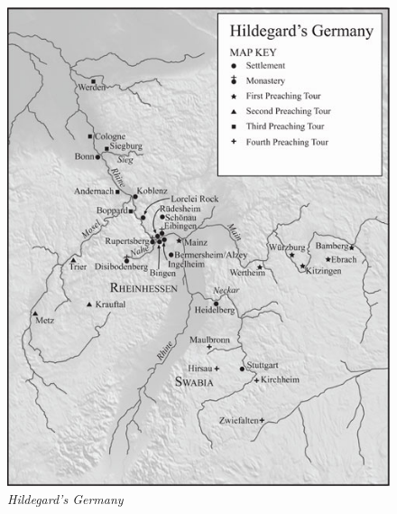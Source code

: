 \documentclass{turabian-researchpaper}
\begin{document}
\begin{figure}
    \includegraphics{Hildegard_map.jpg}
    \caption{\emph{Hildegard's Germany}\autocite{ISHVBS}}
    \label{Hildegard's Germany.}
\end{figure}

\clearpage
\printbibliography
\end{document}
